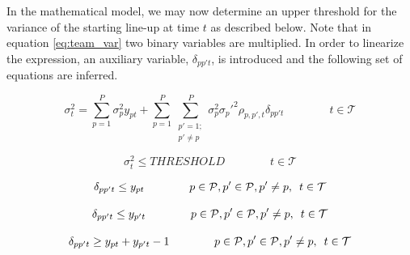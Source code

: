 In the mathematical model, we may now determine an upper threshold for the variance of the starting line-up at time $t$ as described below. Note that in equation \ref{eq:team_var} two binary variables are multiplied. In order to linearize the expression, an auxiliary variable, $\delta_{pp't}$, is introduced and the following set of equations are inferred.

\begin{equation} \label{eq:variance}
    \sigma^2_{t} = \sum_{p = 1}^{P}\sigma_p^2 y_{pt} + \sum_{p = 1}^{P}\sum_{\substack{p' = 1; \\ p' \neq p}}^{P} \sigma_p^2\sigma_p'^2\rho_{p,p',t} \delta_{pp't} \qquad\qquad t \in \mathcal{T}
\end{equation}

\begin{equation} \label{eq:variance_threshold}
    \sigma^2_{t} \leq THRESHOLD \qquad\qquad t \in \mathcal{T}
\end{equation}

\begin{equation} \label{eq:variance_p_beta}
    \delta_{pp't} \leq y_{pt}  \qquad\qquad p \in \mathcal{P}, p' \in \mathcal{P}, p' \neq p, \enskip t \in \mathcal{T}
\end{equation}

\begin{equation} \label{eq:variance_p_dash_beta}
    \delta_{pp't} \leq y_{p't}  \qquad\qquad p \in \mathcal{P}, p' \in \mathcal{P}, p' \neq p, \enskip t \in \mathcal{T}
\end{equation}

\begin{equation} \label{eq:variance_p_p_dash_beta}
    \delta_{pp't} \geq y_{pt} + y_{p't} - 1  \qquad\qquad p \in \mathcal{P}, p' \in \mathcal{P}, p' \neq p, \enskip t \in \mathcal{T}
\end{equation}

